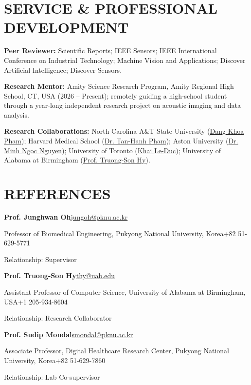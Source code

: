 \documentclass[a4paper,10pt]{extarticle}
\newcommand{\cventry}[2]{\noindent\textbf{#1}\hfill #2\par}
\newcommand{\cvline}[2]{\noindent #1\hfill #2\par}
\newcommand{\entrydetail}[1]{\noindent #1\par}
\newenvironment{cvlist}{\begin{list}{}{%
  \setlength{\leftmargin}{0pt}\setlength{\itemindent}{0pt}%
  \setlength{\parsep}{0pt}\setlength{\itemsep}{4pt}\setlength{\topsep}{4pt}}}%
  {\end{list}}
\begin{document}
\section*{SERVICE \& PROFESSIONAL DEVELOPMENT}
\noindent
\textbf{Peer Reviewer:} Scientific Reports; IEEE Sensors; IEEE International Conference on Industrial Technology; Machine Vision and Applications; Discover Artificial Intelligence; Discover Sensors.

\smallskip
\noindent
\textbf{Research Mentor:} Amity Science Research Program, Amity Regional High School, CT, USA (2026 -- Present); remotely guiding a high-school student through a year-long independent research project on acoustic imaging and data analysis.

\smallskip
\noindent
\textbf{Research Collaborations:} North Carolina A\&T State University (\href{https://www.linkedin.com/in/khoa-pham-dang-686115173/}{Dang Khoa Pham}); Harvard Medical School (\href{https://connects.catalyst.harvard.edu/Profiles/display/Person/224327}{Dr. Tan-Hanh Pham}); Aston University (\href{https://www.linkedin.com/in/minh-ng\%E1\%BB\%8Dc-nguy\%E1\%BB\%85n-4a96582a0/}{Dr. Minh Ngoc Nguyen}); University of Toronto (\href{https://scholar.google.com/citations?user=DfAzEe0AAAAJ\&hl=vi}{Khai Le-Duc}); University of Alabama at Birmingham (\href{https://scholars.uab.edu/19454-truongson-hy/about}{Prof. Truong-Son Hy}).

\section*{REFERENCES}
\begin{cvlist}
    \item
    \cventry{Prof. Junghwan Oh}{\href{mailto:jungoh@pknu.ac.kr}{jungoh@pknu.ac.kr}}
    \cvline{Professor of Biomedical Engineering, Pukyong National University, Korea}{+82 51-629-5771}
    \entrydetail{Relationship: Supervisor}

    \item
    \cventry{Prof. Truong-Son Hy}{\href{mailto:thy@uab.edu}{thy@uab.edu}}
    \cvline{Assistant Professor of Computer Science, University of Alabama at Birmingham, USA}{+1 205-934-8604}
    \entrydetail{Relationship: Research Collaborator}

    \item
    \cventry{Prof. Sudip Mondal}{\href{mailto:smondal@pknu.ac.kr}{smondal@pknu.ac.kr}}
    \cvline{Associate Professor, Digital Healthcare Research Center, Pukyong National University, Korea}{+82 51-629-7860}
    \entrydetail{Relationship: Lab Co-supervisor}
\end{cvlist}

\end{document}
